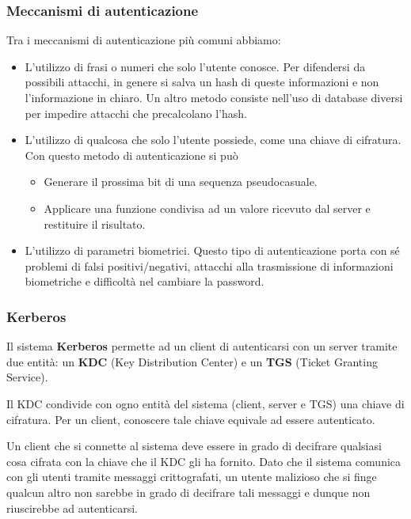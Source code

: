 \subsubsection{Meccanismi di autenticazione}
Tra i meccanismi di autenticazione più comuni abbiamo:
\begin{itemize}
	\item L'utilizzo di frasi o numeri che solo l'utente conosce. Per difendersi da possibili attacchi, in genere si
	      salva un hash di queste informazioni e non l'informazione in chiaro. Un altro metodo consiste nell'uso di
	      database diversi per impedire attacchi che precalcolano l'hash.
	\item L'utilizzo di qualcosa che solo l'utente possiede, come una chiave di cifratura. Con questo metodo di
	      autenticazione si può
	      \begin{itemize}
		      \item Generare il prossima bit di una sequenza pseudocasuale.
		      \item Applicare una funzione condivisa ad un valore ricevuto dal server e restituire il risultato.
	      \end{itemize}
	\item L'utilizzo di parametri biometrici. Questo tipo di autenticazione porta con sé problemi di falsi
	      positivi/negativi, attacchi alla trasmissione di informazioni biometriche e difficoltà nel cambiare la
	      password.
\end{itemize}

\subsubsection{Kerberos}
Il sistema \textbf{Kerberos} permette ad un client di autenticarsi con un server tramite due entità: un \textbf{KDC}
(Key Distribution Center) e un \textbf{TGS}	(Ticket Granting Service).

Il KDC condivide con ogno entità del sistema (client, server e TGS) una chiave di cifratura. Per un client, conoscere
tale chiave equivale ad essere autenticato.

Un client che si connette al sistema deve essere in grado di decifrare qualsiasi cosa cifrata con la chiave che il KDC
gli ha fornito. Dato che il sistema comunica con gli utenti tramite messaggi crittografati, un utente malizioso che si
finge qualcun altro non sarebbe in grado di decifrare tali messaggi e dunque non riuscirebbe ad autenticarsi.

